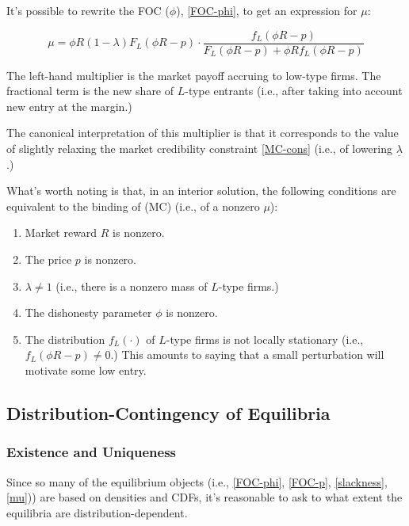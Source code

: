 \documentclass{article}
\theoremstyle{definition}
\begin{document}
It's possible to rewrite the FOC ($\phi$), \eqref{FOC-phi}, to get an expression for $\mu$: 

\begin{equation}
    \label{mu}
    \mu = \phi R(1 - \lambda)F_L(\phi R - p) \cdot \frac{f_L(\phi R - p)}{F_L(\phi R - p) + \phi R f_L (\phi R - p)}
\end{equation}

The left-hand multiplier is the market payoff accruing to low-type firms. The fractional term is the new share of $L$-type entrants (i.e., after taking into account new entry at the margin.)

The canonical interpretation of this multiplier is that it corresponds to the value of slightly relaxing the market credibility constraint \eqref{MC-cons} (i.e., of lowering $\underline{\lambda}$.)

What's worth noting is that, in an interior solution, the following conditions are equivalent to the binding of (MC) (i.e., of a nonzero $\mu$):

\begin{enumerate}
    \item Market reward $R$ is nonzero. 
    \item The price $p$ is nonzero.
    \item $\lambda \neq 1$ (i.e., there is a nonzero mass of $L$-type firms.)
    \item The dishonesty parameter $\phi$ is nonzero.
    \item The distribution $f_L(\cdot)$ of $L$-type firms is not locally stationary (i.e., $f_L (\phi R - p) \neq 0$.) This amounts to saying that a small perturbation will motivate some low entry.
\end{enumerate}

\subsection{Distribution-Contingency of Equilibria}

\subsubsection{Existence and Uniqueness}

Since so many of the equilibrium objects (i.e., \eqref{FOC-phi}, \eqref{FOC-p}, \eqref{slackness}, \eqref{mu})) are based on densities and CDFs, it's reasonable to ask to what extent the equilibria are distribution-dependent.  
\end{document}
